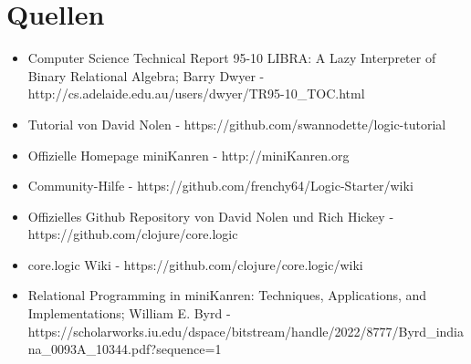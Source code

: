 \section{Quellen}

\begin{itemize}
\item Computer Science Technical Report 95-10 LIBRA: A Lazy Interpreter of Binary Relational Algebra; Barry Dwyer - http://cs.adelaide.edu.au/users/dwyer/TR95-10_TOC.html

\item Tutorial von David Nolen - https://github.com/swannodette/logic-tutorial

\item Offizielle Homepage miniKanren - http://miniKanren.org

\item Community-Hilfe - https://github.com/frenchy64/Logic-Starter/wiki

\item Offizielles Github Repository von David Nolen und Rich Hickey - https://github.com/clojure/core.logic

\item core.logic Wiki - https://github.com/clojure/core.logic/wiki

\item Relational Programming in miniKanren: Techniques, Applications, and Implementations; William E. Byrd - https://scholarworks.iu.edu/dspace/bitstream/handle/2022/8777/Byrd_indiana_0093A_10344.pdf?sequence=1
\end{itemize}
